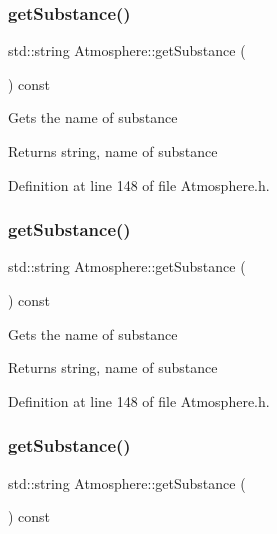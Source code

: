 \subsubsection{\texorpdfstring{get\+Substance()}{getSubstance()}\hspace{0.1cm}{\footnotesize\ttfamily [1/3]}}
{\footnotesize\ttfamily std\+::string Atmosphere\+::get\+Substance (\begin{DoxyParamCaption}{ }\end{DoxyParamCaption}) const\hspace{0.3cm}{\ttfamily [inline]}}

Gets the name of substance \begin{DoxyReturn}{Returns}
string, name of substance 
\end{DoxyReturn}


Definition at line 148 of file Atmosphere.\+h.

\mbox{\label{class_atmosphere_a3ac0fb0d4fc92edc690e44b40b7018c2}} 
\subsubsection{\texorpdfstring{get\+Substance()}{getSubstance()}\hspace{0.1cm}{\footnotesize\ttfamily [2/3]}}
{\footnotesize\ttfamily std\+::string Atmosphere\+::get\+Substance (\begin{DoxyParamCaption}{ }\end{DoxyParamCaption}) const\hspace{0.3cm}{\ttfamily [inline]}}

Gets the name of substance \begin{DoxyReturn}{Returns}
string, name of substance 
\end{DoxyReturn}


Definition at line 148 of file Atmosphere.\+h.

\mbox{\label{class_atmosphere_a3ac0fb0d4fc92edc690e44b40b7018c2}} 
\subsubsection{\texorpdfstring{get\+Substance()}{getSubstance()}\hspace{0.1cm}{\footnotesize\ttfamily [3/3]}}
{\footnotesize\ttfamily std\+::string Atmosphere\+::get\+Substance (\begin{DoxyParamCaption}{ }\end{DoxyParamCaption}) const\hspace{0.3cm}{\ttfamily [inline]}}

